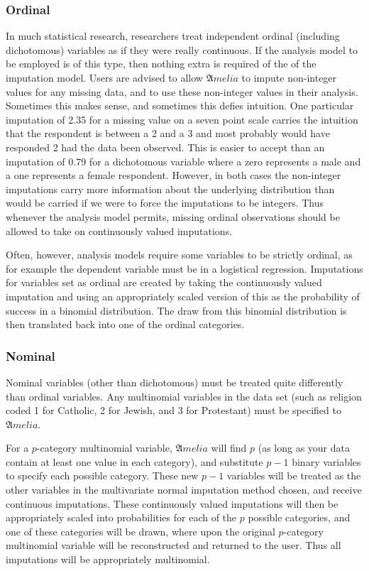 \documentclass[12pt,titlepage]{article}
\begin{document}
\subsubsection{Ordinal}
\label{sec:ord}
In much statistical research, researchers treat independent ordinal
(including dichotomous) variables as if they were really continuous.
If the analysis model to be employed is of this type, then nothing
extra is required of the of the imputation model. Users are advised to
allow ${\mathfrak Amelia}$ to impute non-integer values for any
missing data, and to use these non-integer values in their analysis.
Sometimes this makes sense, and sometimes this defies intuition. One
particular imputation of 2.35 for a missing value on a seven point
scale carries the intuition that the respondent is between a 2 and a 3
and most probably would have responded 2 had the data been observed.
This is easier to accept than an imputation of 0.79 for a dichotomous
variable where a zero represents a male and a one represents a female
respondent. However, in both cases the non-integer imputations carry
more information about the underlying distribution than would be
carried if we were to force the imputations to be integers. Thus
whenever the analysis model permits, missing ordinal observations
should be allowed to take on continuously valued imputations.

Often, however, analysis models require some variables to be strictly
ordinal, as for example the dependent variable must be in a logistical
regression.  Imputations for variables set as ordinal are created by
taking the continuously valued imputation and using an appropriately
scaled version of this as the probability of success in a binomial
distribution. The draw from this binomial distribution is then
translated back into one of the ordinal categories.

\subsubsection{Nominal}
\label{sec:nom}
Nominal variables (other than dichotomous) must be treated quite
differently than ordinal variables. Any multinomial variables in the
data set (such as religion coded 1 for Catholic, 2 for Jewish, and 3
for Protestant) must be specified to ${\mathfrak Amelia}$.

For a $ p$-category multinomial variable, ${\mathfrak Amelia}$ will
find $ p$ (as long as your data contain at least one value in each
category), and substitute $ p-1$ binary variables to specify each
possible category. These new $ p-1$ variables will be treated as the
other variables in the multivariate normal imputation method chosen,
and receive continuous imputations. These continuously valued
imputations will then be appropriately scaled into probabilities for
each of the $ p$ possible categories, and one of these categories will
be drawn, where upon the original $ p$-category multinomial variable
will be reconstructed and returned to the user. Thus all imputations
will be appropriately multinomial.
\end{document}
